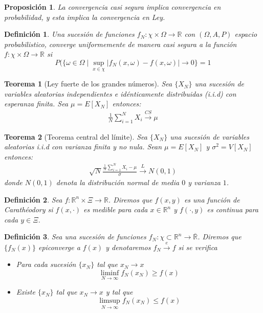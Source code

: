 \documentclass[twoside,a4paper,openright,12pt]{book}
\newtheorem{defi}{Definici\'on}[section]
\newtheorem{prop}{Proposici\'on}[section]
\newtheorem{thm}{Teorema}[section]
\providecommand{\abs}[1]{\left|{#1}\right|}
\providecommand{\conv}[1]{\overset{#1}{\longrightarrow}}
\providecommand{\convcs}{\xrightarrow{CS}}
\providecommand{\conve}{\xrightarrow{e}}
\providecommand{\func}[2]{\colon{#1}\longrightarrow{#2}}
\newcommand{\R}{\mathbb{R}}
\begin{document}
\begin{prop}
La convergencia casi segura implica convergencia en probabilidad, y esta implica la convergencia en Ley.
\end{prop}
\begin{defi}
Una sucesión de funciones $f_N\func{\chi\times\Omega}{\R}$ con $(\Omega,A,P)$ espacio probabilistico, converge uniformemente de manera casi segura a la función $f\func{\chi\times\Omega}{\R}$ si 
$$
P(\{\omega\in\Omega \mid \sup_{x\in\chi}\abs{f_N(x,\omega)-f(x,\omega)}\to 0\}=1
$$
\end{defi}
\begin{thm}[Ley fuerte de los grandes números]\label{grandesnumeros}
Sea $\{X_N\}$ una sucesión de variables aleatorias independientes e idénticamente distribuidas (i.i.d) con esperanza finita. Sea $\mu = E[X_N]$ entonces:
\begin{gather*}
\frac{1}{N} \sum_{i=1}^N X_i \convcs \mu
\end{gather*}
\end{thm}
\begin{thm}[Teorema central del límite]
Sea $\{X_N\}$ una sucesión de variables aleatorias i.i.d con varianza finita y no nula. Sean $\mu = E[X_N]$ y $\sigma^2 = V[X_N]$ entonces:
\begin{gather*}
\sqrt{N}\frac{\frac{1}{N} \sum_{i=1}^N X_i-\mu}{\sigma} \conv{L} N(0,1)
\end{gather*}
donde $N(0,1)$ denota la distribución normal de media $0$ y varianza $1$.
\end{thm}
\begin{defi}
Sea $f\func{\R^n\times \Xi}{\R}$. Diremos que $f(x,y)$ es una función de Carathéodory si $f(x,\cdot)$ es medible para cada $x\in\R^n$ y $f(\cdot,y)$ es continua para cada $y\in\Xi$.
\end{defi}
\begin{defi}
Sea una sucesión de funciones $f_N \func{\chi\subset \R^n}{\overline{\R}}$. Diremos que $\{f_N(x)\}$ epiconverge a $f(x)$ y denotaremos $f_N\conve f$ si se verifica
\begin{itemize}
\item Para cada sucesión $\{x_N\}$ tal que $x_N\to x$ 
$$
\liminf_{N\to\infty} f_N(x_N)\geq f(x)
$$
\item Existe $\{x_N\}$ tal que $x_N \to x$ y tal que
$$
\limsup_{N\to\infty} f_N(x_N)\leq f(x)
$$
\end{itemize}
\end{defi}
\end{document}

